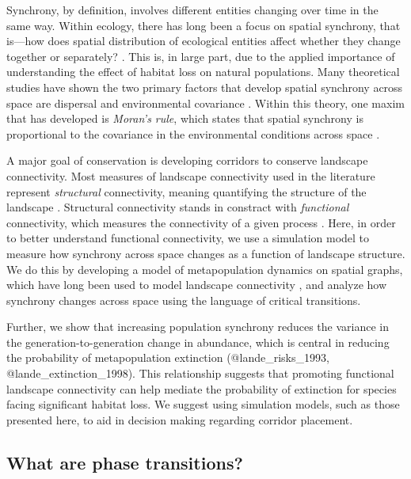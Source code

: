 \documentclass[]{article}
\begin{document}
Synchrony, by definition, involves different entities changing over time in the same way. Within ecology, there has long been a focus on spatial synchrony, that is—how does spatial distribution of ecological entities affect whether they change together or separately? \cite{jarillo_spatial_2020, kendall_dispersal_2000, hanski_spatial_1993}.
This is, in large part, due to the applied importance of understanding the effect of habitat loss on natural populations. Many theoretical studies have shown the two primary factors that develop spatial synchrony across space are dispersal and environmental covariance \cite{ripa_analysing_2000, abbott_does_2007}.
Within this theory, one maxim that has developed is \textit{Moran's rule}, which states that spatial synchrony is proportional to the covariance in the environmental conditions across space \cite{ranta_synchrony_1995, bjornstad_spatial_1999}.


A major goal of conservation is developing corridors to conserve
landscape connectivity. Most measures of landscape connectivity used in the literature represent \emph{structural} connectivity, meaning quantifying the
structure of the landscape \cite{}. Structural connectivity stands in constract with \emph{functional} connectivity, which measures the connectivity of a given process \cite{kool_population_2013, calabrese_comparison-shoppers_2004}. Here,
in order to better understand functional connectivity, we use a
simulation model to measure how synchrony across space changes as a
function of landscape structure. We do this by developing a model of
metapopulation dynamics on spatial graphs, which have long been used to
model landscape connectivity \cite{martensen_spatio-temporal_2017,
@albert_applying_2017, @urban_landscape_2001}, and analyze how
synchrony changes across space using the language of critical
transitions.

Further, we show that increasing population synchrony reduces the
variance in the generation-to-generation change in abundance, which is
central in reducing the probability of metapopulation extinction
(@lande\_risks\_1993, @lande\_extinction\_1998). This relationship
suggests that promoting functional landscape connectivity can help
mediate the probability of extinction for species facing significant
habitat loss. We suggest using simulation models, such as those
presented here, to aid in decision making regarding corridor placement.


\hypertarget{what-are-phase-transitions}{%
\subsection{What are phase
transitions?}\label{what-are-phase-transitions}}
\end{document}
